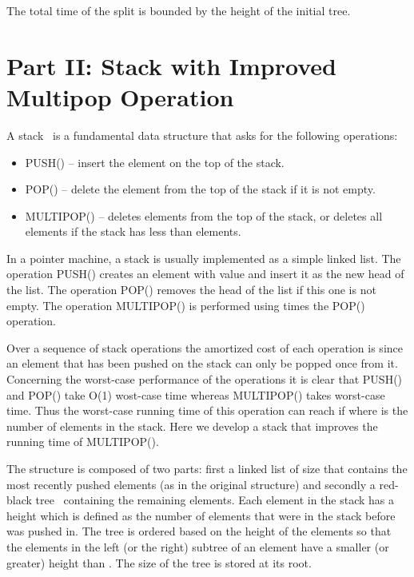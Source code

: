 \documentclass[letterpaper,11pt]{article}
\begin{document}
The total time of the split is bounded by the height of the initial tree.







\section*{Part II: Stack with Improved Multipop Operation}
\label{stack}
A stack~\cite{Cormen2001} is a fundamental data structure that asks for the following operations:
\begin{itemize}
\item {P{\scriptsize USH}()} -- insert the element  on the top of the stack.
\item {P{\scriptsize OP}()} -- delete the element from the top of the stack if it is not empty.
\item {M{\scriptsize ULTIPOP}()} -- deletes  elements from the top of the stack, or deletes all elements if the stack has less than  elements.
\end{itemize}
In a pointer machine, a stack is usually implemented as a simple linked list. The operation {P{\scriptsize USH}()} creates an element with value  and insert it as the new head of the list. The operation {P{\scriptsize OP}()} removes the head of the list if this one is not empty. The operation {M{\scriptsize ULTIPOP}()} is performed using  times the {P{\scriptsize OP}()} operation.

Over a sequence of stack operations the amortized cost of each operation is  since an element that has been pushed on the stack can only be popped once from it. Concerning the worst-case performance of the operations it is clear that {P{\scriptsize USH}()} and {P{\scriptsize OP}()} take O(1) wost-case time whereas {M{\scriptsize ULTIPOP}()} takes  worst-case time. Thus the worst-case running time of this operation can reach  if  where  is the number of elements in the stack. Here we develop a stack that improves the running time of {M{\scriptsize ULTIPOP}()}. 

The structure is composed of two parts: first a linked list  of size  that contains the most recently pushed elements (as in the original structure) and secondly a red-black tree~\cite{redblack}  containing the remaining elements. Each element  in the stack has a height  which is defined as the number of elements that were in the stack before  was pushed in. The tree  is ordered based on the height of the elements so that the elements in the left (or the right) subtree of an element  have a smaller (or greater) height than . The size  of the tree is stored at its root.
\end{document}
